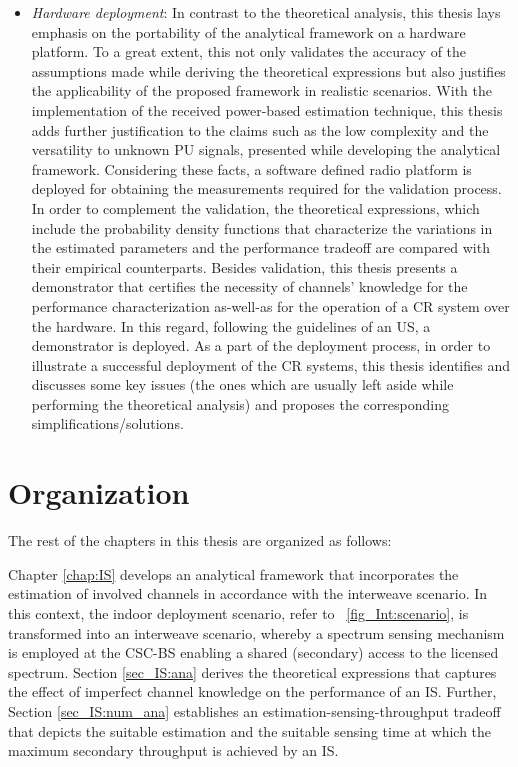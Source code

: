 \begin{itemize}
 
\item \textit{Hardware deployment}: 
In contrast to the theoretical analysis, this thesis lays emphasis on the portability of the analytical framework on a hardware platform. To a great extent, this not only validates the accuracy of the assumptions made while deriving the theoretical expressions but also justifies the applicability of the proposed framework in realistic scenarios. With the implementation of the received power-based estimation technique, this thesis adds further justification to the claims such as the low complexity and the versatility to unknown PU signals, presented while developing the analytical framework. Considering these facts, a software defined radio platform is deployed for obtaining the measurements required for the validation process. In order to complement the validation, the theoretical expressions, which include the probability density functions that characterize the variations in the estimated parameters and the performance tradeoff are compared with their empirical counterparts. Besides validation, this thesis presents a demonstrator that certifies the necessity of channels' knowledge for the performance characterization as-well-as for the operation of a CR system over the hardware. In this regard, following the guidelines of an US, a demonstrator is deployed. As a part of the deployment process, %
in order to illustrate a successful deployment of the CR systems, this thesis identifies and discusses some key issues (the ones which are usually left aside while performing the theoretical analysis) and proposes the corresponding simplifications/solutions.  
\end{itemize}

\section{Organization} %

The rest of the chapters in this thesis are organized as follows:

Chapter \ref{chap:IS} develops an analytical framework that incorporates the estimation of involved channels in accordance with the interweave scenario. In this context, the indoor deployment scenario, refer to \figurename~\ref{fig_Int:scenario}, is transformed into an interweave scenario, whereby a spectrum sensing mechanism is employed at the CSC-BS enabling a shared (secondary) access to the licensed spectrum. Section \ref{sec_IS:ana} derives the theoretical expressions that captures the effect of imperfect channel knowledge on the performance of an IS. Further, Section \ref{sec_IS:num_ana} establishes an estimation-sensing-throughput tradeoff that depicts the suitable estimation and the suitable sensing time at which the maximum secondary throughput is achieved by an IS. 


